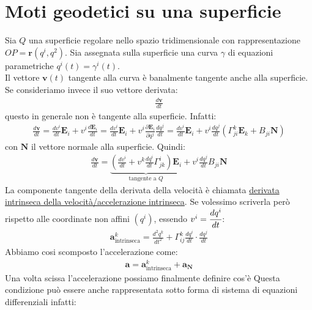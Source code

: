 \section{Moti geodetici su una superficie}
Sia $Q$ una superficie regolare nello spazio tridimensionale con rappresentazione $OP=\mathbf{r}(q^i,q^2)$. Sia assegnata sulla superficie una curva $\gamma$ di equazioni parametriche $q^i(t)=\gamma^i(t)$.\\
Il vettore $\mathbf{v}(t)$ tangente alla curva è banalmente tangente anche alla superficie. Se consideriamo invece il suo vettore derivata:
\begin{align*}
    \frac{d\mathbf{v}}{dt}
\end{align*}
questo in generale non è tangente alla superficie. Infatti:
\begin{align*}
   \frac{d\mathbf{v}}{dt} =\frac{dv^i}{dt}\mathbf{E}_i+v^i\frac{d\mathbf{E}_i}{dt}=\frac{dv^i}{dt}\mathbf{E}_i+v^i\frac{\partial \mathbf{E}_i}{\partial q^j}\frac{dq^j}{dt}=\frac{dv^i}{dt}\mathbf{E}_i+v^i\frac{dq^j}{dt}(\Gamma_{ji}^k\mathbf{E}_k+B_{ji}\mathbf{N})
\end{align*}
con $\mathbf{N}$ il vettore normale alla superficie. Quindi:
\begin{align*}
    \frac{d\mathbf{v}}{dt}=\underbrace{\left(\frac{dv^i}{dt}+v^k\frac{dq^i}{dt}\Gamma^i_{jk}\right)\mathbf{E}_i}_{\text{tangente a }Q}+v^i\frac{dq^j}{dt}B_{ji}\mathbf{N}
\end{align*}
La componente tangente della derivata della velocità è chiamata \ul{derivata intrinseca della velocità/accelerazione intrinseca}. Se volessimo scriverla però rispetto alle coordinate non affini $(q^i)$, essendo $v^i=\cfrac{dq^i}{dt}$:
\begin{align*}
    \mathbf{a}^k_{\text{intrinseca}}=\frac{d^2q^k}{dt^2}+\Gamma^k_{ij}\frac{dq^i}{dt}\cdot \frac{dq^j}{dt}
\end{align*}
Abbiamo cosi scomposto l'accelerazione come:
\begin{align*}
    \mathbf{a}=\mathbf{a}^k_{\text{intrinseca}}+\mathbf{a}_{\mathbf{N}}
\end{align*}
Una volta scissa l'accelerazione possiamo finalmente definire cos'è 
Questa condizione può essere anche rappresentata sotto forma di sistema di equazioni differenziali infatti:\\
